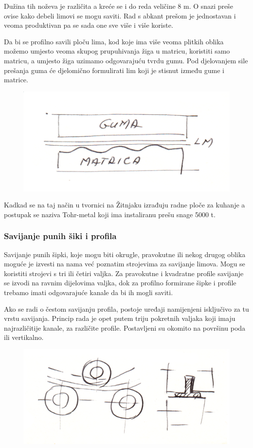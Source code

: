 \documentclass[a4paper,12pt]{article}
\numberwithin{figure}{section}
\begin{document}
\FloatBarrier
Dužina tih noževa je različita a kreće se i do reda veličine 8 m. O snazi preše ovise kako debeli limovi se mogu saviti. Rad s abkant prešom je jednostavan i veoma produktivan pa se sada one sve više i više koriste.\par
Da bi se profilno savili ploču lima, kod koje ima više veoma plitkih oblika možemo umjesto veoma skupog prupuhivanja žiga u matricu, koristiti samo matricu, a umjesto žiga uzimamo odgovarajuću tvrdu gumu. Pod djelovanjem sile prešanja guma će djelomično formulirati lim koji je stisnut između gume i matrice.
\begin{figure}[!h]
\centering
\includegraphics[scale=0.15]{image_49-2.png}
\end{figure}
\FloatBarrier
Kadkad se na taj način u tvornici na Žitnjaku izrađuju radne ploče za kuhanje a postupak se naziva Tohr-metal koji ima instaliranu prešu snage 5000 t.
\subsubsection{Savijanje punih šiki i profila}
Savijanje punih šipki, koje mogu biti okrugle, pravokutne ili nekog drugog oblika moguće je izvesti na nama već poznatim strojevima za savijanje limova. Mogu se koristiti strojevi s tri ili četiri valjka. Za pravokutne i kvadratne profile savijanje se izvodi na ravnim dijelovima valjka, dok za profilno formirane šipke i profile trebamo imati odgovarajuće kanale da bi ih mogli saviti.\par
Ako se radi o čestom savijanju profila, postoje uređaji namijenjeni isključivo za tu vrstu savijanja. Princip rada je opet putem triju pokretnih valjaka koji imaju najrazličitije kanale, za različite profile. Postavljeni su okomito na površinu poda ili vertikalno.
\begin{figure}[!h]
\centering
\includegraphics[scale=0.12]{image_49-3.png}
\end{figure}
\FloatBarrier
\end{document}
